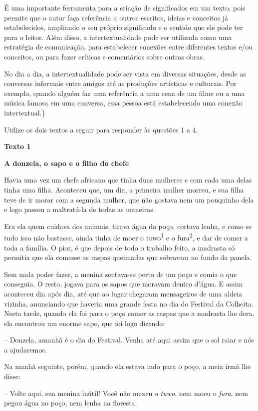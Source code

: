 É uma importante ferramenta para a criação de significados em um texto,
pois permite que o autor faça referência a outros escritos, ideias e
conceitos já estabelecidos, ampliando o seu próprio significado e o
sentido que ele pode ter para o leitor. Além disso, a intertextualidade
pode ser utilizada como uma estratégia de comunicação, para estabelecer
conexões entre diferentes textos e/ou conceitos, ou para fazer críticas
e comentários sobre outras obras.

No dia a dia, a intertextualidade pode ser vista em diversas situações,
desde as conversas informais entre amigos até as produções artísticas e
culturais. Por exemplo, quando alguém faz uma referência a uma cena de
um filme ou a uma música famosa em uma conversa, essa pessoa está
estabelecendo uma conexão intertextual.\}

Utilize os dois textos a seguir para responder às questões 1 a 4.

\textbf{Texto 1}

\textbf{A donzela, o sapo e o filho do chefe}

Havia uma vez um chefe africano que tinha duas mulheres e com cada uma
delas tinha uma filha. Aconteceu que, um dia, a primeira mulher morreu,
e sua filha teve de ir morar com a segunda mulher, que não gostava nem
um pouquinho dela e logo passou a maltratá-la de todas as maneiras.

Era ela quem cuidava dos animais, tirava água do poço, cortava lenha, e
como se tudo isso não bastasse, ainda tinha de moer o
tuwo\textsuperscript{1} e o fura\textsuperscript{2}, e dar de comer a
toda a família. O pior, é que depois de todo o trabalho feito, a
madrasta só permitia que ela comesse as raspas queimadas que sobravam no
fundo da panela.

Sem nada poder fazer, a menina sentava-se perto de um poço e comia o que
conseguia. O resto, jogava para os sapos que moravam dentro d'água. E
assim aconteceu dia após dia, até que ao lugar chegaram mensageiros de
uma aldeia vizinha, anunciando que haveria uma grande festa no dia do
Festival da Colheita. Nesta tarde, quando ela foi para o poço comer as
raspas que a madrasta lhe dera, ela encontrou um enorme sapo, que foi
logo dizendo:

-- Donzela, amanhã é o dia do Festival. Venha até aqui assim que o sol
raiar e nós a ajudaremos.

Na manhã seguinte, porém, quando ela estava indo para o poço, a meia
irmã lhe disse:

-- Volte aqui, sua menina inútil! Você não mexeu o \emph{tuwo}, nem moeu
o \emph{fura}, nem pegou água no poço, nem lenha na floresta.


